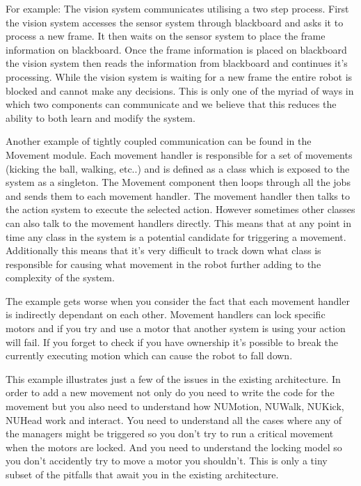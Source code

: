 \documentclass[english,12pt]{scrartcl}
\begin{document}
            For example: The vision system communicates utilising a two step process. 
            First the vision system accesses the sensor system through blackboard and asks it to process a new frame.
            It then waits on the sensor system to place the frame information on blackboard. 
            Once the frame information is placed on blackboard the vision system then reads the information 
            from blackboard and continues it's processing. 
            While the vision system is waiting for a new frame the entire robot is blocked and cannot make any decisions.
            This is only one of the myriad of ways in which two components can communicate and we believe that 
            this reduces the ability to both learn and modify the system.

            Another example of tightly coupled communication can be found in the Movement module.
            Each movement handler is responsible for a set of movements (kicking the ball, walking, etc..) and
            is defined as a class which is exposed to the system as a singleton.
            The Movement component then loops through all the jobs and sends them to each movement 
            handler.
            The movement handler then talks to the action system to execute the selected action. 
            However sometimes other classes can also talk to the movement handlers directly. 
            This means that at any point in time any class in the system is a potential candidate for
            triggering a movement. 
            Additionally this means that it's very difficult to track down what class is responsible for causing what
            movement in the robot further adding to the complexity of the system.

            The example gets worse when you consider the fact that each movement handler is indirectly dependant on
            each other. 
            Movement handlers can lock specific motors and if you try and use a motor that another system is using your action will fail.
            If you forget to check if you have ownership it's possible to break the currently executing motion which can cause the robot to fall down.
            
            This example illustrates just a few of the issues in the existing architecture.
            In order to add a new movement not only do you need to write the code for the movement but
            you also need to understand how NUMotion, NUWalk, NUKick, NUHead work and interact. You need to
            understand all the cases where any of the managers might be triggered so you don't try to run a critical
            movement when the motors are locked. 
            And you need to understand the locking model so you don't accidently try to move a motor you shouldn't.
            This is only a tiny subset of the pitfalls that await you in the existing architecture.
\end{document}
